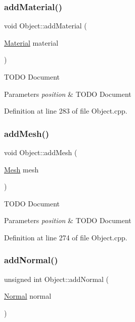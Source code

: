 \subsubsection{\texorpdfstring{add\+Material()}{addMaterial()}}
{\footnotesize\ttfamily void Object\+::add\+Material (\begin{DoxyParamCaption}\item[{\hyperlink{class_material}{Material}}]{material }\end{DoxyParamCaption})}

T\+O\+DO Document 
\begin{DoxyParams}{Parameters}
{\em position} & T\+O\+DO Document \\
\hline
\end{DoxyParams}


Definition at line 283 of file Object.\+cpp.

\mbox{\label{class_object_a1ef8f20019002996c0c62f2b6a38b4f6}} 
\subsubsection{\texorpdfstring{add\+Mesh()}{addMesh()}}
{\footnotesize\ttfamily void Object\+::add\+Mesh (\begin{DoxyParamCaption}\item[{\hyperlink{class_mesh}{Mesh}}]{mesh }\end{DoxyParamCaption})}

T\+O\+DO Document 
\begin{DoxyParams}{Parameters}
{\em position} & T\+O\+DO Document \\
\hline
\end{DoxyParams}


Definition at line 274 of file Object.\+cpp.

\mbox{\label{class_object_aeac027a860fad228b5cd3fa4c1a477f8}} 
\subsubsection{\texorpdfstring{add\+Normal()}{addNormal()}}
{\footnotesize\ttfamily unsigned int Object\+::add\+Normal (\begin{DoxyParamCaption}\item[{\hyperlink{struct_normal}{Normal}}]{normal }\end{DoxyParamCaption})}

